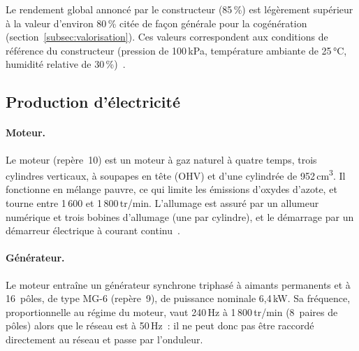 Le rendement global annoncé par le constructeur (85\,\%) est légèrement supérieur à la valeur d'environ 80\,\% citée de façon générale pour la cogénération (section~\ref{subsec:valorisation}). Ces valeurs correspondent aux conditions de référence du constructeur (pression de 100\,kPa, température ambiante de 25\,°C, humidité relative de 30\,\%)~\cite{mchp}.

\subsection{Production d'électricité}
\label{subsec:prod-elec}

\paragraph{Moteur.} Le moteur (repère~10) est un moteur à gaz naturel à quatre temps, trois cylindres verticaux, à soupapes en tête (OHV) et d'une cylindrée de 952\,cm\textsuperscript{3}. Il fonctionne en mélange pauvre, ce qui limite les émissions d'oxydes d'azote, et tourne entre 1\,600 et 1\,800\,tr/min. L'allumage est assuré par un allumeur numérique et trois bobines d'allumage (une par cylindre), et le démarrage par un démarreur électrique à courant continu~\cite{mchp}.

\paragraph{Générateur.} Le moteur entraîne un générateur synchrone triphasé à aimants permanents et à 16~pôles, de type MG-6 (repère~9), de puissance nominale 6,4\,kW. Sa fréquence, proportionnelle au régime du moteur, vaut 240\,Hz à 1\,800\,tr/min (8~paires de pôles) alors que le réseau est à 50\,Hz~: il ne peut donc pas être raccordé directement au réseau et passe par l'onduleur.

